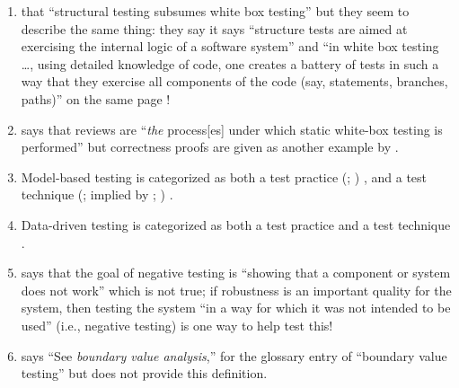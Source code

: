 \begin{enumerate}
    \item %
           \citeauthor{PetersAndPedrycz2000} 
          that ``structural testing
          subsumes white box testing'' but they seem to describe the same thing:
          \ifnotpaper they say \else it says \fi ``structure tests are aimed at
          exercising the internal logic of a software system'' and ``in white box
          testing \dots, using detailed knowledge of code, one creates a battery of
          tests in such a way that they exercise all components of the code
          (say, statements, branches, paths)'' on the same page
          \citeyearpar[p.~447]{PetersAndPedrycz2000}!
    \item %
           \citet[p.~92\ifnotpaper, emphasis added\fi]{Patton2006}
          says that reviews are ``\emph{the} process[es] under which static
          white-box testing is performed'' but correctness proofs are given
          as another example by \citet[pp.~418-419]{vanVliet2000}.

    \item %
          Model-based testing is categorized as both a test practice
          \ifnotpaper
              (\citealp[p.~22]{IEEE2022}; \citeyear[p.~viii]{IEEE2021})
          \else
              \cite[p.~22]{IEEE2022}, \cite[p.~viii]{IEEE2021}
          \fi and a test technique
          \ifnotpaper
              (\citealp[p.~4]{Kam2008}; implied by
              \citealp[p.~7]{IEEE2021}; \citeyear[p.~469]{IEEE2017})%
          \else
              \cite[p.~4]{Kam2008}%
          \fi.
    \item %
          Data-driven testing is categorized as both a test practice
          \citep[p.~22]{IEEE2022} and a test technique
          \citep[p.~43]{Kam2008}.
    \item %
           \citet[p.~46]{Kam2008} says that the goal
          of negative testing is ``showing that a component or system does not
          work'' which is not true; if robustness is an important quality for
          the system, then testing the system ``in a way for which it was not
          intended to be used'' \citepISTQB{} (i.e., negative testing) is one
          way to help test this!
    \item %
           \citet[p.~42]{Kam2008} says ``See \emph{boundary value
              analysis},'' for the glossary entry of ``boundary value testing''
          but does not provide this definition.
\end{enumerate}